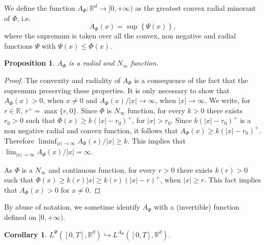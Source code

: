 \documentclass[twoside]{article}
\newtheorem{cor}[thm]{Corollary}
\newtheorem{prop}[thm]{Proposition}
\theoremstyle{remark}
\newcounter{example}[section]
\newcommand{\lphi}{L^{\Phi}}
\newcommand{\rr}{\mathbb{R}}
\renewcommand{\leq}{\leqslant}
\renewcommand{\geq}{\geqslant}
\begin{document}
We define the function $A_{\Phi}:\rr^d\to [0,+\infty)$ as the greatest convex radial minorant of $\Phi$, i.e.
\begin{equation}\label{eq:inversa-gral}
A_{\Phi}(x)=\sup\left\{\Psi(x) \right\},
\end{equation}
where the supremum is taken over all the convex, non negative and radial functions $\Psi$ with $\Psi(x)\leq \Phi(x)$.

\begin{prop}\label{prop:AsubPhi}  $A_{\Phi}$ is a radial and $N_{\infty}$ function.
\end{prop}

\begin{proof} The convexity and radiality of $A_{\Phi}$ is a consequence of the fact that the supremum preserving these properties. It is only necessary to show that $A_{\Phi}(x)>0$, when $x\neq 0$ and  $A_{\Phi}(x)/|x|\to\infty$, when $|x|\to\infty$. We write, for $r\in\rr$, $r^+=\max\{r,0\}$. Since $\Phi$ is $N_{\infty}$ function,  for every $k>0$ there exists $r_0>0$ such that  $\Phi(x)\geq k(|x|-r_0)^+$, for $|x|>r_0$.  Since $ k(|x|-r_0)^+$ is a non negative radial and convex function, it follows that $A_{\Phi}(x)\geq k(|x|-r_0)^+$. Therefore $\liminf_{|x|\to\infty} A_{\Phi}(s)/|x|\geq k$. This implies that   $\lim_{|x|\to\infty} A_{\Phi}(x)/|x|=\infty$.

As $\Phi$ is a
$N_{\infty}$ and continuous function, for every $r>0$ there exists $k(r)>0$ such that $\Phi(x)\geq k(r)|x|\geq k(r)(|x|-r)^+$, when $|x|\geq r$. This fact implies that $A_{\Phi}(x)>0$ for $x\neq 0$.
\end{proof}
By abuse of notation, we sometime identify $A_{\Phi}$ with a (invertible) function defined on $[0,+\infty)$. 
\begin{cor}\label{cor:incr_aphi} $\lphi([0,T],\rr^d) \hookrightarrow L^{A_{\Phi}}([0,T],\rr^d)$.

\end{cor}
% 
% 
% 
% 
% 
% 
\end{document}
